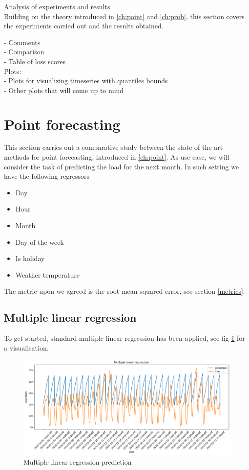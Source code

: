 Analysis of experiments and results
\\
Building on the theory introduced in \ref{ch:point} and \ref{ch:prob}, this section covers the experiments carried out and the results obtained.

- Comments
\\
- Comparison
\\
- Table of loss scores
\\
Plots:
\\
- Plots for visualizing timeseries with quantiles bounds
\\
- Other plots that will come up to mind

\section{Point forecasting}
This section carries out a comparative study between the state of the art methods for point forecasting, introduced in \ref{ch:point}.
As use case, we will consider the task of predicting the load for the next month.
In such setting we have the following regressors
\begin{itemize}
    \item Day
    \item Hour
    \item Month
    \item Day of the week
    \item Is holiday
    \item Weather temperature
\end{itemize}
The metric upon we agreed is the root mean squared error, see section \ref{metrics}.
\subsection{Multiple linear regression}
To get started, standard multiple linear regression has been applied, see fig \ref{fig:mlr_price} for a visualisation. 
\begin{figure}
    \includegraphics[width=\textwidth]{images/mlr_price.png}
    \caption{Multiple linear regression prediction}
    \label{fig:mlr_price}
\end{figure}

